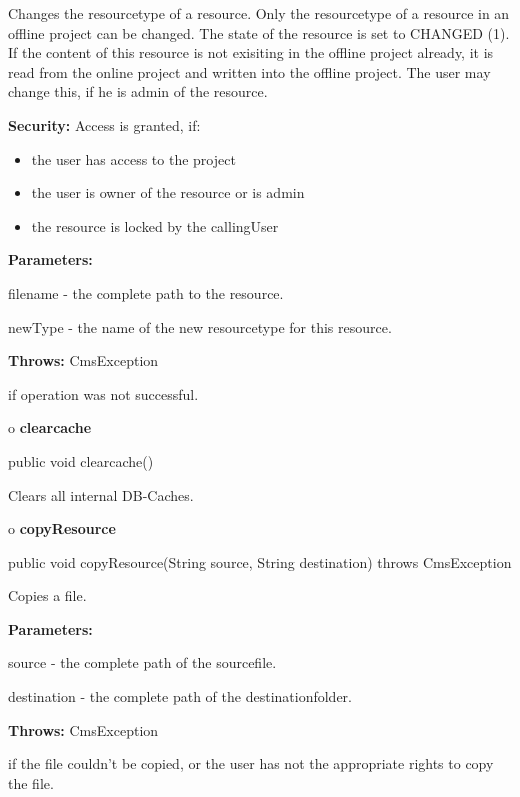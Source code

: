 \begin{description}
\htmlDD Changes the resourcetype of a resource. \htmlBR
Only the resourcetype of a resource in an offline project can be changed. The
state of the resource is set to CHANGED (1). If the content of this resource
is not exisiting in the offline project already, it is read from the online
project and written into the offline project. The user may change this, if he
is admin of the resource. 

{\bf Security:} Access is granted, if: 

\begin{itemize}
\item the user has access to the project 
\item the user is owner of the resource or is admin 
\item the resource is locked by the callingUser 
\end{itemize}

\begin{description}
\item {\bf Parameters:}  

filename - the complete path to the resource.  

newType - the name of the new resourcetype for this resource.  
\item {\bf Throws:} CmsException  

if operation was not successful.  
\end{description}

\end{description}

o {\bf clearcache} 

\begin{PRE}
 public void clearcache()
\end{PRE}

\begin{description}
\htmlDD Clears all internal DB-Caches. 

\end{description}

o {\bf copyResource} 

\begin{PRE}
 public void copyResource(String source,
                          String destination) throws CmsException
\end{PRE}

\begin{description}
\htmlDD Copies a file. 

\begin{description}
\item {\bf Parameters:}  

source - the complete path of the sourcefile.  

destination - the complete path of the destinationfolder.  
\item {\bf Throws:} CmsException  

if the file couldn't be copied, or the user has not the appropriate rights to
copy the file.  
\end{description}

\end{description}

